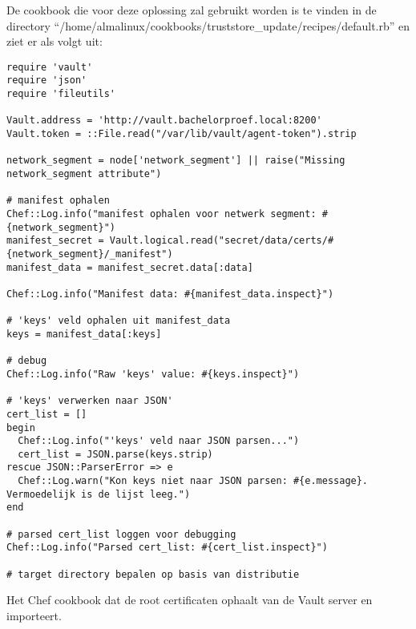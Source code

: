 De cookbook die voor deze oplossing zal gebruikt worden is te vinden in de directory ``/home/almalinux/cookbooks/truststore\_update/recipes/default.rb'' en ziet er als volgt uit:
\begin{listing}[H]
\begin{verbatim}
require 'vault'
require 'json'
require 'fileutils'

Vault.address = 'http://vault.bachelorproef.local:8200'
Vault.token = ::File.read("/var/lib/vault/agent-token").strip

network_segment = node['network_segment'] || raise("Missing network_segment attribute")

# manifest ophalen
Chef::Log.info("manifest ophalen voor netwerk segment: #{network_segment}")
manifest_secret = Vault.logical.read("secret/data/certs/#{network_segment}/_manifest")
manifest_data = manifest_secret.data[:data]

Chef::Log.info("Manifest data: #{manifest_data.inspect}")

# 'keys' veld ophalen uit manifest_data
keys = manifest_data[:keys]

# debug
Chef::Log.info("Raw 'keys' value: #{keys.inspect}")

# 'keys' verwerken naar JSON'
cert_list = []
begin
  Chef::Log.info("'keys' veld naar JSON parsen...")
  cert_list = JSON.parse(keys.strip)
rescue JSON::ParserError => e
  Chef::Log.warn("Kon keys niet naar JSON parsen: #{e.message}. Vermoedelijk is de lijst leeg.")
end

# parsed cert_list loggen voor debugging
Chef::Log.info("Parsed cert_list: #{cert_list.inspect}")

# target directory bepalen op basis van distributie

\end{verbatim}
\caption[Chef cookbook voor importeren van root certificaten van de Vault]{Het Chef cookbook dat de root certificaten ophaalt van de Vault server en importeert.}
\end{listing}

